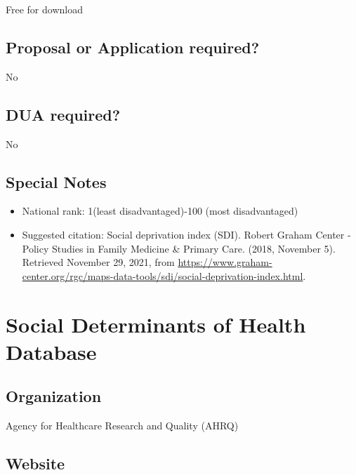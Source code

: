 \documentclass[
]{book}
\providecommand{\tightlist}{%
  \setlength{\itemsep}{0pt}\setlength{\parskip}{0pt}}
\begin{document}
Free for download

\hypertarget{proposal-or-application-required-80}{%
\section{Proposal or Application required?}\label{proposal-or-application-required-80}}

No

\hypertarget{dua-required-80}{%
\section{DUA required?}\label{dua-required-80}}

No

\hypertarget{special-notes-80}{%
\section{Special Notes}\label{special-notes-80}}

\begin{itemize}
\tightlist
\item
  National rank: 1(least disadvantaged)-100 (most disadvantaged)
\item
  Suggested citation: Social deprivation index (SDI). Robert Graham Center - Policy Studies in Family Medicine \& Primary Care. (2018, November 5). Retrieved November 29, 2021, from \url{https://www.graham-center.org/rgc/maps-data-tools/sdi/social-deprivation-index.html}.
\end{itemize}

\mainmatter

\hypertarget{social-determinants-of-health-database}{%
\chapter{Social Determinants of Health Database}\label{social-determinants-of-health-database}}

\hypertarget{organization-81}{%
\section{Organization}\label{organization-81}}

Agency for Healthcare Research and Quality (AHRQ)

\hypertarget{website-81}{%
\section{Website}\label{website-81}}
\end{document}

